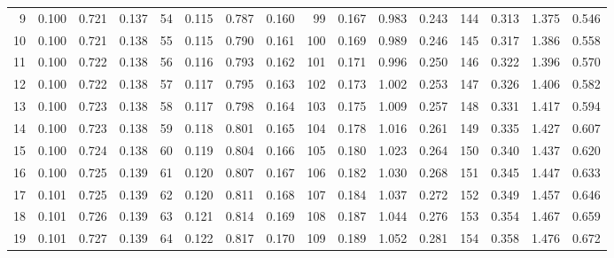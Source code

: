\begin{table}
{\begin{tabular}{rrrr|rrrr|rrrr|crrr}
  9 & \tiny{  0.100} &   0.721 & \tiny{  0.137} &  54 & \tiny{  0.115} &   0.787 & \tiny{  0.160} &  99 & \tiny{  0.167} &   0.983 & \tiny{  0.243} & 144 & \tiny{  0.313} &   1.375 & \tiny{  0.546}\\
 10 & \tiny{  0.100} &   0.721 & \tiny{  0.138} &  55 & \tiny{  0.115} &   0.790 & \tiny{  0.161} & 100 & \tiny{  0.169} &   0.989 & \tiny{  0.246} & 145 & \tiny{  0.317} &   1.386 & \tiny{  0.558}\\
 11 & \tiny{  0.100} &   0.722 & \tiny{  0.138} &  56 & \tiny{  0.116} &   0.793 & \tiny{  0.162} & 101 & \tiny{  0.171} &   0.996 & \tiny{  0.250} & 146 & \tiny{  0.322} &   1.396 & \tiny{  0.570}\\
 12 & \tiny{  0.100} &   0.722 & \tiny{  0.138} &  57 & \tiny{  0.117} &   0.795 & \tiny{  0.163} & 102 & \tiny{  0.173} &   1.002 & \tiny{  0.253} & 147 & \tiny{  0.326} &   1.406 & \tiny{  0.582}\\
 13 & \tiny{  0.100} &   0.723 & \tiny{  0.138} &  58 & \tiny{  0.117} &   0.798 & \tiny{  0.164} & 103 & \tiny{  0.175} &   1.009 & \tiny{  0.257} & 148 & \tiny{  0.331} &   1.417 & \tiny{  0.594}\\
 14 & \tiny{  0.100} &   0.723 & \tiny{  0.138} &  59 & \tiny{  0.118} &   0.801 & \tiny{  0.165} & 104 & \tiny{  0.178} &   1.016 & \tiny{  0.261} & 149 & \tiny{  0.335} &   1.427 & \tiny{  0.607}\\
 15 & \tiny{  0.100} &   0.724 & \tiny{  0.138} &  60 & \tiny{  0.119} &   0.804 & \tiny{  0.166} & 105 & \tiny{  0.180} &   1.023 & \tiny{  0.264} & 150 & \tiny{  0.340} &   1.437 & \tiny{  0.620}\\
 16 & \tiny{  0.100} &   0.725 & \tiny{  0.139} &  61 & \tiny{  0.120} &   0.807 & \tiny{  0.167} & 106 & \tiny{  0.182} &   1.030 & \tiny{  0.268} & 151 & \tiny{  0.345} &   1.447 & \tiny{  0.633}\\
 17 & \tiny{  0.101} &   0.725 & \tiny{  0.139} &  62 & \tiny{  0.120} &   0.811 & \tiny{  0.168} & 107 & \tiny{  0.184} &   1.037 & \tiny{  0.272} & 152 & \tiny{  0.349} &   1.457 & \tiny{  0.646}\\
 18 & \tiny{  0.101} &   0.726 & \tiny{  0.139} &  63 & \tiny{  0.121} &   0.814 & \tiny{  0.169} & 108 & \tiny{  0.187} &   1.044 & \tiny{  0.276} & 153 & \tiny{  0.354} &   1.467 & \tiny{  0.659}\\
 19 & \tiny{  0.101} &   0.727 & \tiny{  0.139} &  64 & \tiny{  0.122} &   0.817 & \tiny{  0.170} & 109 & \tiny{  0.189} &   1.052 & \tiny{  0.281} & 154 & \tiny{  0.358} &   1.476 & \tiny{  0.672}\\

\end{tabular}}
\end{table}

